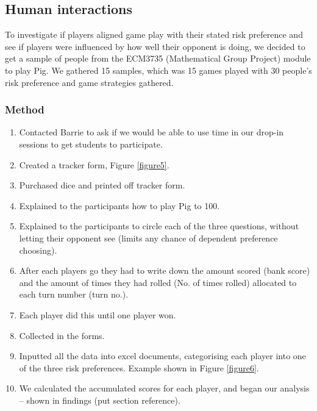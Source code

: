 \documentclass[a4paper,titlepage]{article}
\begin{document}
\subsection{Human interactions}
To investigate if players aligned game play with their stated risk preference and see if players were influenced by how well their opponent is doing, we decided to get a sample of people from the ECM3735 (Mathematical Group Project) module to play Pig. We gathered 15 samples, which was 15 games played with 30 people’s risk preference and game strategies gathered.
\subsubsection{Method}
\begin{enumerate}
\item Contacted Barrie to ask if we would be able to use time in our drop-in sessions to get students to participate.
\item Created a tracker form, Figure \ref{figure5}.
\item Purchased dice and printed off tracker form.
\item Explained to the participants how to play Pig to 100.
\item Explained to the participants to circle each of the three questions, without letting their opponent see (limits any chance of dependent preference choosing).
\item After each players go they had to write down the amount scored (bank score) and the amount of times they had rolled (No. of times rolled) allocated to each turn number (turn no.).
\item Each player did this until one player won.
\item Collected in the forms.
\item Inputted all the data into excel documents, categorising each player into one of the three risk preferences. Example shown in Figure \ref{figure6}.
\item We calculated the accumulated scores for each player, and began our analysis – shown in findings (put section reference).
\end{enumerate}
\end{document}
